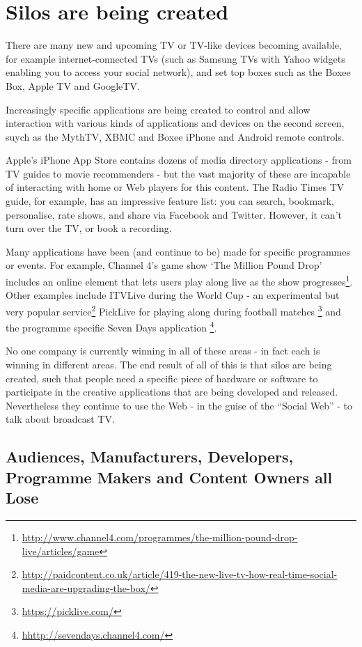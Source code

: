 \documentclass[]{article}%
\begin{document}
\section{Silos are being created}

There are many new and upcoming TV or TV-like devices becoming available, for example internet-connected TVs (such as Samsung TVs with Yahoo widgets enabling you to access your social network), and set top boxes such as the Boxee Box, Apple TV and GoogleTV. 

Increasingly specific applications are being created to control and allow interaction with various kinds of applications and devices on the second screen, suych as the MythTV, XBMC and Boxee iPhone and Android remote controls.

Apple's iPhone App Store contains dozens of media directory applications - from TV guides to movie recommenders - but the vast majority of these are incapable of interacting with home or Web players for this content. The Radio Times TV guide, for example, has an impressive feature list: you can search, bookmark, personalise, rate shows, and share via Facebook and Twitter. However, it can't turn over the TV, or book a recording. 

Many applications have been (and continue to be) made for specific programmes or events. For example, Channel 4's game show `The Million Pound Drop' includes an online element that lets users play along live as the show progresses\footnote{\url{http://www.channel4.com/programmes/the-million-pound-drop-live/articles/game}}. Other examples include ITVLive during the World Cup - an experimental but very popular service\footnote{\url{http://paidcontent.co.uk/article/419-the-new-live-tv-how-real-time-social-media-are-upgrading-the-box/}} PickLive for playing along during football matches \footnote{\url{https://picklive.com/}} and the programme specific Seven Days application \footnote{\url{hhttp://sevendays.channel4.com/}}.

No one company is currently winning in all of these areas - in fact each is winning in different areas. The end result of all of this is that silos are being created, such that people need a specific piece of hardware or software to participate in the creative applications that are being developed and released. Nevertheless they continue to use the Web - in the guise of the ``Social Web'' - to talk about broadcast TV. 

\subsection{Audiences, Manufacturers, Developers, Programme Makers and Content Owners all Lose}
\end{document}
